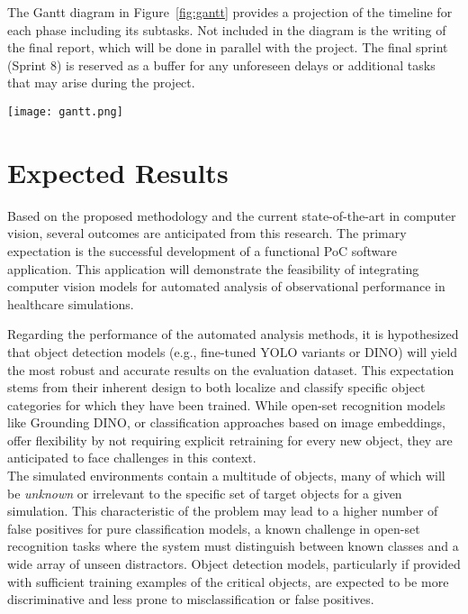 \documentclass[english]{hogent-article}
\begin{document}
The Gantt diagram in Figure~\ref{fig:gantt} provides a projection of the timeline for each phase including its subtasks.
Not included in the diagram is the writing of the final report, which will be done in parallel with the project.
The final sprint (Sprint 8) is reserved as a buffer for any unforeseen delays or additional tasks that may arise during the project.

\begin{figure*}
  \centering
  \texttt{[image: gantt.png]}
  \caption{\label{fig:gantt}Gantt diagram of the research phases and milestones for each sprint.}
\end{figure*}

\section{Expected Results}
\label{sec:expected-results}

Based on the proposed methodology and the current state-of-the-art in computer vision, several outcomes are anticipated from this research.
The primary expectation is the successful development of a functional PoC software application. 
This application will demonstrate the feasibility of integrating computer vision models for automated analysis of observational performance in healthcare simulations.

Regarding the performance of the automated analysis methods, it is hypothesized that object detection models (e.g., fine-tuned YOLO variants or DINO) will yield the most robust and accurate results on the evaluation dataset.
This expectation stems from their inherent design to both localize and classify specific object categories for which they have been trained.
While open-set recognition models like Grounding DINO, or classification approaches based on image embeddings, offer flexibility by not requiring explicit retraining for every new object, they are anticipated to face challenges in this context.\\
The simulated environments contain a multitude of objects, many of which will be \textit{unknown} or irrelevant to the specific set of target objects for a given simulation.
This characteristic of the problem may lead to a higher number of false positives for pure classification models, a known challenge in open-set recognition tasks where the system must distinguish between known classes and a wide array of unseen distractors.
Object detection models, particularly if provided with sufficient training examples of the critical objects, are expected to be more discriminative and less prone to misclassification or false positives.
\end{document}
